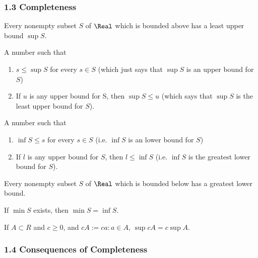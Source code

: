 \subsubsection*{1.3 Completeness}

\begin{theorem}
  Every nonempty subset $S$ of $\Real$ which is bounded above has a least upper bound $\sup S$.
\end{theorem}

\begin{definition}
  A number such that 
  \begin{enumerate}[(1)]
    \item $s \leq \sup S$ for every $s \in S$ (which just says that $\sup S$ is an upper bound for $S$)
    \item If $u$ is any upper bound for S, then $\sup S \leq u$ (which says that $\sup S$ is the least upper bound for $S$).
  \end{enumerate}
\end{definition}

\begin{definition}
  A number such that 
  \begin{enumerate}[(1)]
    \item $\inf S \leq s$ for every $s \in S$ (i.e. $\inf S$ is an lower bound for $S$)
    \item If $l$ is any upper bound for $S$, then $l \leq \inf S$ (i.e. $\inf S$ is the greatest lower bound for $S$).
  \end{enumerate}
\end{definition}

\begin{theorem}
  Every nonempty subset $S$ of $\Real$ which is bounded below has a greatest lower bound.
\end{theorem}

\begin{theorem}
  If $\min S$ exists, then $\min S = \inf S$.
\end{theorem}

\begin{theorem}
  If $A \subset R$ and $c \geq 0$, and $cA := {ca : a \in A}$, $\sup cA = c \sup A$.
\end{theorem}

\subsubsection*{1.4 Consequences of Completeness}


